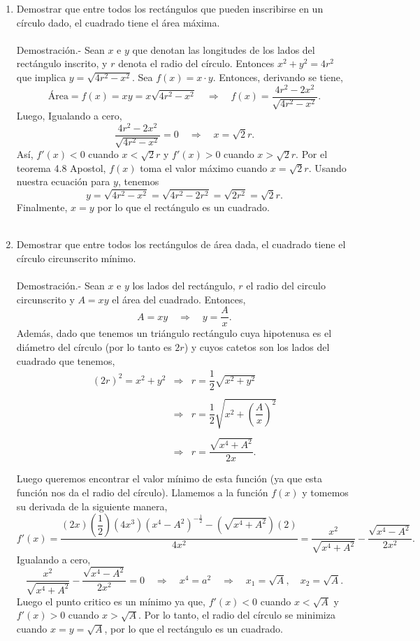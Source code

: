 \begin{enumerate}[\bfseries 1.]
    \item Demostrar que entre todos los rectángulos que pueden inscribirse en un círculo dado, el cuadrado tiene el área máxima.\\\\
	Demostración.-\; Sean $x$ e $y$ que denotan las longitudes de los lados del rectángulo inscrito, y $r$ denota el radio del círculo. Entonces $x^2+y^2=4r^2$ que implica $y=\sqrt{4r^2-x^2}$. Sea $f(x)=x\cdot y$. Entonces, derivando se tiene,
	$$\mbox{Área}=f(x)=xy=x\sqrt{4r^2-x^2}\quad \Rightarrow \quad f(x)=\dfrac{4r^2-2x^2}{\sqrt{4r^2-x^2}}.$$
	Luego, Igualando a cero,
	$$\dfrac{4r^2-2x^2}{\sqrt{4r^2-x^2}}=0\quad \Rightarrow \quad x=\sqrt{2}r.$$
	Así, $f'(x)<0$ cuando $x<\sqrt{2}r$ y $f'(x)>0$ cuando $x>\sqrt{2}r$. Por el teorema 4.8 Apostol, $f(x)$ toma el valor máximo cuando $x=\sqrt{2}r$. Usando nuestra ecuación para $y$, tenemos
	$$y=\sqrt{4r^2-x^2}=\sqrt{4r^2-2r^2}=\sqrt{2r^2}=\sqrt{2}r.$$
	Finalmente, $x=y$ por lo que el rectángulo es un cuadrado.\\\\

    \item Demostrar que entre todos los rectángulos de área dada, el cuadrado tiene el círculo circunscrito mínimo.\\\\
	Demostración.-\; Sean $x$ e $y$ los lados del rectángulo, $r$ el radio del circulo circunscrito y $A=xy$ el área del cuadrado. Entonces,
	$$A=xy\quad \Rightarrow \quad y=\dfrac{A}{x}.$$
	Además, dado que tenemos un triángulo rectángulo cuya hipotenusa es el diámetro del círculo (por lo tanto es $2r$) y cuyos catetos son los lados del cuadrado que tenemos,
	$$\begin{array}{rcl}
	    (2r)^2=x^2+y^2&\Rightarrow &r=\dfrac{1}{2}\sqrt{x^2+y^2}\\\\
			  &\Rightarrow&r=\dfrac{1}{2}\sqrt{x^2+\left(\dfrac{A}{x}\right)^2}\\\\
			  &\Rightarrow&r=\dfrac{\sqrt{x^4+A^2}}{2x}.\\\\
	\end{array}$$
	Luego queremos encontrar el valor mínimo de esta función (ya que esta función nos da el radio del círculo). Llamemos a la función $f(x)$ y tomemos su derivada de la siguiente manera, 
	$$f'(x)=\dfrac{(2x)\left(\dfrac{1}{2}\right)\left(4x^3\right)\left(x^4-A^2\right)^{-\frac{1}{2}}-\left(\sqrt{x^4+A^2}\right)(2)}{4x^2}=\dfrac{x^2}{\sqrt{x^4+A^2}}-\dfrac{\sqrt{x^4-A^2}}{2x^2}.$$
	Igualando a cero,
	$$\dfrac{x^2}{\sqrt{x^4+A^2}}-\dfrac{\sqrt{x^4-A^2}}{2x^2}=0\quad \Rightarrow \quad x^4=a^2\quad \Rightarrow \quad x_1=\sqrt{A},\quad x_2=\sqrt{A}.$$
	Luego el punto critico es un mínimo ya que, $f'(x)<0$ cuando $x<\sqrt{A}$ y $f'(x)>0$ cuando $x>\sqrt{A}$. Por lo tanto, el radio del círculo se minimiza cuando $x=y=\sqrt{A}$, por lo que el rectángulo es un cuadrado.\\\\


\end{enumerate}
